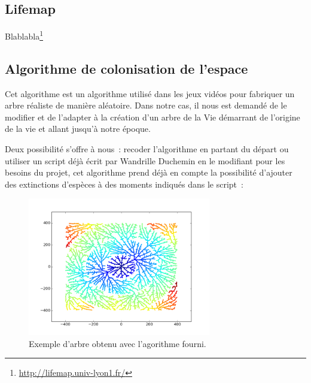 \documentclass[a4paper]{article}
\begin{document}
	\subsection{Lifemap}
		Blablabla\footnote{\url{http://lifemap.univ-lyon1.fr/}}

	\subsection{Algorithme de colonisation de l'espace}
		Cet algorithme est un algorithme utilisé dans les jeux vidéos pour fabriquer un arbre réaliste de manière aléatoire. Dans notre cas, il nous est demandé de le modifier et de l’adapter à la création d’un arbre de la Vie démarrant  de l’origine de la vie et allant jusqu’à notre époque.
	
		Deux possibilité s’offre à nous :  recoder l’algorithme en partant du départ ou utiliser un script déjà écrit par Wandrille Duchemin en le modifiant pour les besoins du projet, cet algorithme prend déjà en compte la possibilité d’ajouter des extinctions d’espèces à des moments indiqués dans le script :
		\begin{figure}[!h]
			\centering
			\includegraphics[width=8cm]{./img/multipleExtinction.png}
			\caption{Exemple d'arbre obtenu avec l'agorithme fourni.}
		\end{figure}
	
\end{document}
